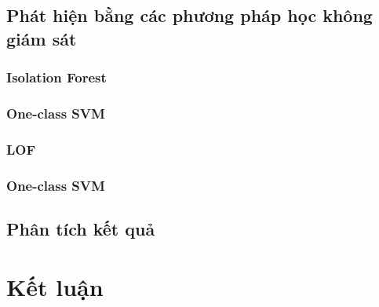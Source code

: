 \subsection{Phát hiện bằng các phương pháp học không giám sát}
\subsubsection{Isolation Forest}
\subsubsection{One-class SVM}
\subsubsection{LOF}
\subsubsection{One-class SVM}
\subsection{Phân tích kết quả}


\section{Kết luận}


